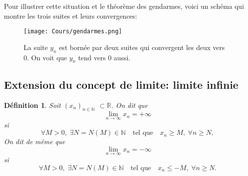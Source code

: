 \documentclass[a4paper, 12pt, french, twoside]{article}
\newtheorem{theorem}{Théorème}[section]
\newtheorem{defi}[theorem]{Définition}
\newcommand{\Nn}{{\mathbb{N}}}
\newcommand{\Rr}{{\mathbb{R}}}
\begin{document}
Pour illustrer cette situation et le théorème des gendarmes, voici un schéma qui montre les trois suites et leurs convergences:

\begin{figure}[H]
    \centering
    \texttt{[image: Cours/gendarmes.png]}
    \caption{La suite $y_n$ est bornée par deux suites qui convergent les deux vers 0. On voit que $y_n$ tend vers 0 aussi.}
    \label{fig:enter-label}
\end{figure}



\newpage
\subsection{Extension du concept de limite: limite infinie}\label{limite infinie suite}
\begin{defi}
    

Soit $(x_n)_{n\in\Nn}$ $\subset \Rr$. On dit que 
\begin{equation*}
    \lim_{n\rightarrow\infty}x_n=+\infty
\end{equation*}
si
\begin{equation*}
    \forall M>0, \; \exists N=N(M)\in\Nn \quad\text{tel que} \quad x_n\geq M, \; \forall n\geq N,
\end{equation*}
On dit de même que 
\begin{equation*}
    \lim_{n\rightarrow\infty}x_n=-\infty
\end{equation*}
si
\begin{equation*}
    \forall M>0, \; \exists N=N(M)\in\Nn \quad \text{tel que} \quad x_n\leq -M, \;\forall n\geq N.
\end{equation*}
\end{defi}
\end{document}
